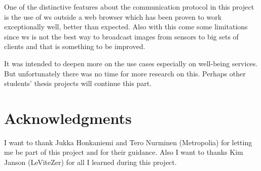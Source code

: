 \documentclass[hidelinks,11pt,a4paper,oneside,article]{memoir}
\begin{document}
 One of the distinctive features about the communication protocol in this project is the use of \gls{ws} outside a web browser which has been proven to work exceptionally well, better than expected. Also with this come some limitations since \gls{ws} is not the best way to broadcast images from sensors to big sets of clients and that is something to be improved.

 It was intended to deepen more on the use cases especially on well-being services. But unfortunately there was no time for more research on this. Perhaps other students' thesis projects will continue this part.




\clearpage{}
\begin{flushleft}
\begin{singlespacing}

\end{singlespacing}
\end{flushleft}

\clearpage\chapter*{Acknowledgments}
I want to thank Jukka Honkaniemi and Tero Nurminen (Metropolia) for letting me be part of this project and for their guidance. Also I want to thanks Kim Janson (LeViteZer) for all I learned during this project.

\label{LastPage}~
\end{document}
